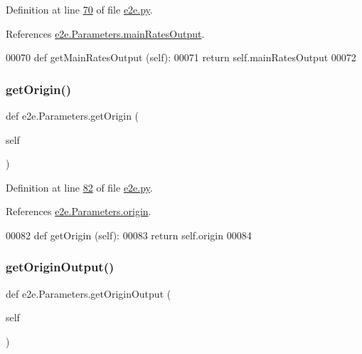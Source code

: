 Definition at line \hyperlink{e2e_8py_source_l00070}{70} of file \hyperlink{e2e_8py_source}{e2e.\+py}.



References \hyperlink{e2e_8py_source_l00031}{e2e.\+Parameters.\+main\+Rates\+Output}.


\begin{DoxyCode}
00070     \textcolor{keyword}{def }getMainRatesOutput (self):
00071         \textcolor{keywordflow}{return} self.mainRatesOutput
00072 
\end{DoxyCode}
\mbox{\label{classe2e_1_1_parameters_ac570cc2f199bcb82a4634be79110a013}} 
\subsubsection{\texorpdfstring{get\+Origin()}{getOrigin()}}
{\footnotesize\ttfamily def e2e.\+Parameters.\+get\+Origin (\begin{DoxyParamCaption}\item[{}]{self }\end{DoxyParamCaption})}



Definition at line \hyperlink{e2e_8py_source_l00082}{82} of file \hyperlink{e2e_8py_source}{e2e.\+py}.



References \hyperlink{e2e_8py_source_l00033}{e2e.\+Parameters.\+origin}.


\begin{DoxyCode}
00082     \textcolor{keyword}{def }getOrigin (self):
00083         \textcolor{keywordflow}{return} self.origin
00084 
\end{DoxyCode}
\mbox{\label{classe2e_1_1_parameters_af0cdd8e6726ccc72387e466c2abe04c2}} 
\subsubsection{\texorpdfstring{get\+Origin\+Output()}{getOriginOutput()}}
{\footnotesize\ttfamily def e2e.\+Parameters.\+get\+Origin\+Output (\begin{DoxyParamCaption}\item[{}]{self }\end{DoxyParamCaption})}



